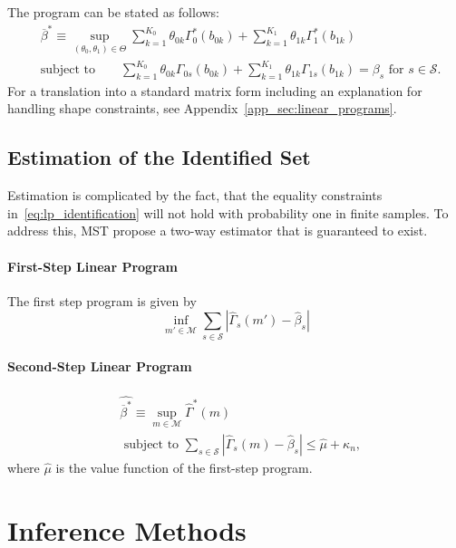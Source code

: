 \documentclass[12pt,a4paper,english]{article} %
\numberwithin{equation}{section}
\theoremstyle{definition}
\theoremstyle{remark}
\theoremstyle{plain}
\begin{document}
The program can be stated as follows:
\begin{align}\label{eq:lp_identification}
  &\overline{\beta}^* \equiv \sup_{(\theta_0, \theta_1)\in\Theta} \sum_{k=1}^{K_0}\theta_{0k}\Gamma^*_0(b_{0k}) + \sum_{k=1}^{K_1}\theta_{1k}\Gamma^*_1(b_{1k}) \\
  &\text{subject to} \qquad \sum_{k=1}^{K_0}\theta_{0k}\Gamma_{0s}(b_{0k}) + \sum_{k=1}^{K_1}\theta_{1k}\Gamma_{1s}(b_{1k}) = \beta_s \text{ for } s \in \mathcal{S}.
\end{align}
For a translation into a standard matrix form including an explanation for handling shape constraints, see Appendix~\ref{app_sec:linear_programs}.

\subsection{Estimation of the Identified Set}
Estimation is complicated by the fact, that the equality constraints in~\ref{eq:lp_identification} will not hold with probability one in finite samples.
To address this, MST propose a two-way estimator that is guaranteed to exist.

\paragraph{First-Step Linear Program}
The first step program is given by
\begin{equation*}\label{eq:lp_estimation_fs}
  \inf_{m'\in \mathcal{M}} \sum_{s\in\mathcal{S}}|\hat{\Gamma}_s(m') - \hat{\beta}_s|
\end{equation*}

\paragraph{Second-Step Linear Program}
\begin{align}\label{eq:lp_estimation}
  & \hat{\overline{\beta}^*} \equiv \sup_{m\in \mathcal{M}}\hat{\Gamma}^*(m) \\
  & \text{ subject to } \sum_{s\in\mathcal{S}}|\hat{\Gamma}_s(m) - \hat{\beta}_s| \leq \hat{\mu} + \kappa_n,
\end{align}
where $\hat{\mu}$ is the value function of the first-step program.

\section{Inference Methods}\label{sec:inference_methods}
\end{document}
